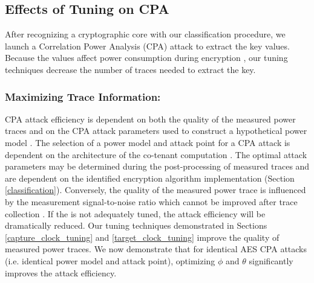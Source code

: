 \vspace{-5pt}
\subsection{Effects of Tuning on CPA}
\label{cpa}



After recognizing a cryptographic core with our classification procedure, we launch a Correlation Power Analysis (CPA)
attack \cite{brier04_correlation} to extract the key values. Because the values affect power consumption during encryption \cite{schellenberg2018inside}, our tuning techniques decrease the number of traces needed to extract the key.

\subsubsection*{\textbf{Maximizing Trace Information: }} 
CPA attack efficiency is dependent on both the quality of the measured power traces and on the CPA attack parameters used to construct a hypothetical power model \cite{krautter2019active, kar2018reducing, yu2017lightweight, mestiri2013comparative}. The selection of a power model and attack point for a CPA attack is dependent on the architecture of the co-tenant computation \cite{mestiri2013comparative}. The optimal attack parameters may be determined during the post-processing of measured traces and are dependent on the identified encryption algorithm implementation (Section \ref{classification}). Conversely, the quality of the measured power trace is influenced by the measurement signal-to-noise ratio which cannot be improved after trace collection \cite{krautter2019active, kar2018reducing, yu2017lightweight}. If the \sensor is not adequately tuned, the attack efficiency will be dramatically reduced. Our tuning techniques demonstrated in Sections \ref{capture_clock_tuning} and \ref{target_clock_tuning} improve the quality of measured power traces. We now demonstrate that for identical AES CPA attacks (i.e. identical power model and attack point), optimizing  $\phi$ and $\theta$ significantly improves the attack efficiency.


